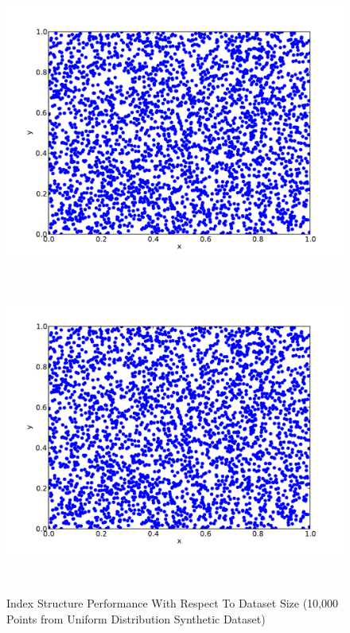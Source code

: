 \begin{figure}
	\begin{center}
		\begin{subfloat}{%
			\includegraphics[scale=0.25]{figures/uniform_distribution.pdf}
		}
		\end{subfloat}~
		\begin{subfloat}{%
			\includegraphics[scale=0.25]{figures/uniform_distribution.pdf}
		}
		\end{subfloat}~
	\end{center}

	\caption{Index Structure Performance With Respect To Dataset Size (10,000 Points from Uniform Distribution Synthetic Dataset)}
	\label{fig:perf3-size}
\end{figure}


